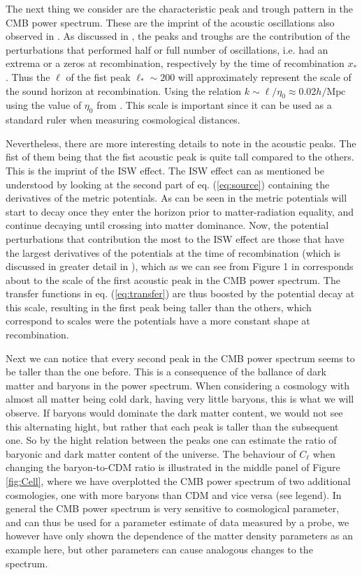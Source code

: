 \documentclass[twocolumn]{aastex62}
\begin{document}
The next thing we consider are the characteristic peak and trough pattern in the CMB power spectrum. These are the imprint of the acoustic oscillations also observed in \cite{stutzer:2020c}. As discussed in \cite{stutzer:2020c}, the peaks and troughs are the contribution of the perturbations that performed half or full number of oscillations, i.e. had an extrema or a zeros at recombination, respectively by the time of recombination $x_*$. Thus the $\ell$ of the fist peak $\ell_*\sim 200$ will approximately represent the scale of the sound horizon at recombination. Using the relation $k \sim \ell / \eta_0 \approx 0.02 h/\mathrm{Mpc}$ using the value of $\eta_0$ from \cite{stutzer:2020a}. This scale is important since it can be used as a standard ruler when measuring cosmological distances. 

Nevertheless, there are more interesting details to note in the acoustic peaks. The fist of them being that the fist acoustic peak is quite tall compared to the others. This is the imprint of the ISW effect. The ISW effect can as mentioned be understood by looking at the second part of eq. (\ref{eq:source}) containing the derivatives of the metric potentials. As can be seen in \cite{stutzer:2020c} the metric potentials will start to decay once they enter the horizon prior to matter-radiation equality, and continue decaying until crossing into matter dominance. Now, the potential perturbations that contribution the most to the ISW effect are those that have the largest derivatives of the potentials at the time of recombination (which is discussed in greater detail in \cite{dodelson:2003}), which as we can see from Figure 1 in \cite{stutzer:2020c} corresponds about to the scale of the first acoustic peak in the CMB power spectrum. The transfer functions in eq. (\ref{eq:transfer}) are thus boosted by the potential decay at this scale, resulting in the first peak being taller than the others, which correspond to scales were the potentials have a more constant shape at recombination.

Next we can notice that every second peak in the CMB power spectrum seems to be taller than the one before. This is a consequence of the ballance of dark matter and baryons in the power spectrum. When considering a cosmology with almost all matter being cold dark, having very little baryons, this is what we will observe. If baryons would dominate the dark matter content, we would not see this alternating hight, but rather that each peak is taller than the subsequent one. So by the hight relation between the peaks one can estimate the ratio of baryonic and dark matter content of the universe. The behaviour of $C_\ell$ when changing the baryon-to-CDM ratio is illustrated in the middle panel of Figure \ref{fig:Cell}, where we have overplotted the CMB power spectrum of two additional cosmologies, one with more baryons than CDM and vice versa (see legend). In general the CMB power spectrum is very sensitive to cosmological parameter, and can thus be used for a parameter estimate of data measured by a probe, we however have only shown the dependence of the matter density parameters as an example here, but other parameters can cause analogous changes to the spectrum.
\end{document}
